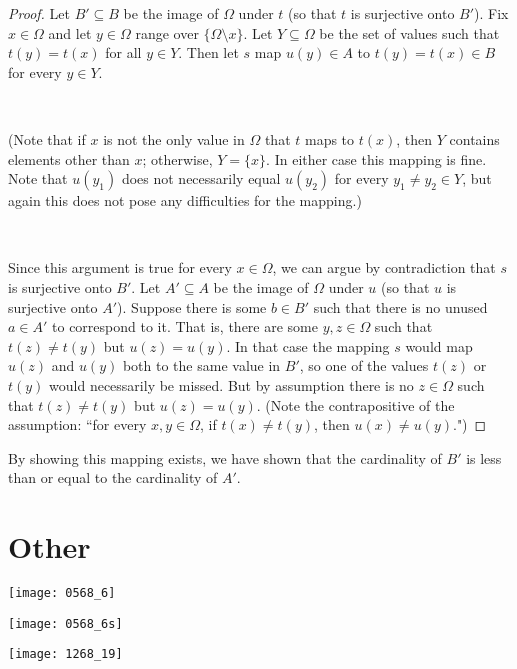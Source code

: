 \begin{proof}
Let \(B' \subseteq B\) be the image of \(\Omega\) under \(t\) (so that \(t\) is surjective onto \(B'\)). Fix \(x \in \Omega\) and let \(y \in \Omega\) range over \(\{\Omega \setminus x \}\). Let \(Y \subseteq \Omega\) be the set of values such that \(t(y) = t(x)\) for all \(y \in Y\). Then let \(s\) map \(u(y) \in A\) to \(t(y) = t(x) \in B\) for every \(y \in Y\). 

\

(Note that if \(x\) is not the only value in \(\Omega\) that \(t\) maps to \(t(x)\), then \(Y\) contains elements other than \(x\); otherwise, \(Y = \{x\}\). In either case this mapping is fine. Note that \(u(y_1)\) does not necessarily equal \(u(y_2)\) for every \(y_1 \neq y_2 \in Y\), but again this does not pose any difficulties for the mapping.)
 
 \
 
 Since this argument is true for every \(x \in \Omega\), we can argue by contradiction that \(s\) is surjective onto \(B'\). Let \(A' \subseteq A\) be the image of \(\Omega\) under \(u\) (so that \(u\) is surjective onto \(A'\)). Suppose there is some \(b \in B'\) such that there is no unused \(a \in A'\) to correspond to it. That is, there are some \(y, z \in \Omega\) such that \(t(z) \neq t(y)\) but \(u(z) = u(y)\). In that case the mapping \(s\) would map \(u(z)\) and \(u(y)\) both to the same value in \(B'\), so one of the values \(t(z)\) or \(t(y)\) would necessarily be missed. But by assumption there is no \(z \in \Omega\) such that \(t(z) \neq t(y)\) but \(u(z) = u(y)\). (Note the contrapositive of the assumption: ``for every $x,y\in\Omega$, if \(t(x) \neq t(y)\), then \(u(x) \neq u(y)\).")
 
 \end{proof}
 
 \begin{remark}By showing this mapping exists, we have shown that the cardinality of \(B'\) is less than or equal to the cardinality of \(A'\).

\end{remark}

\section{Other}

\texttt{[image: 0568\_6]}

\texttt{[image: 0568\_6s]}

\texttt{[image: 1268\_19]}

